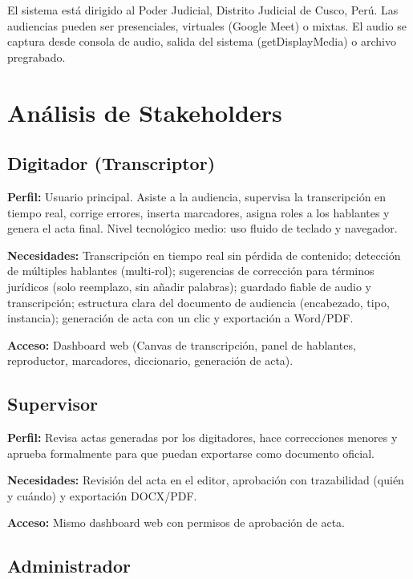 \documentclass[12pt,a4paper]{report}
\begin{document}
El sistema está dirigido al Poder Judicial, Distrito Judicial de Cusco, Perú. Las audiencias pueden ser presenciales, virtuales (Google Meet) o mixtas. El audio se captura desde consola de audio, salida del sistema (getDisplayMedia) o archivo pregrabado.

\section{Análisis de Stakeholders}

\subsection{Digitador (Transcriptor)}

\textbf{Perfil:} Usuario principal. Asiste a la audiencia, supervisa la transcripción en tiempo real, corrige errores, inserta marcadores, asigna roles a los hablantes y genera el acta final. Nivel tecnológico medio: uso fluido de teclado y navegador.

\textbf{Necesidades:} Transcripción en tiempo real sin pérdida de contenido; detección de múltiples hablantes (multi-rol); sugerencias de corrección para términos jurídicos (solo reemplazo, sin añadir palabras); guardado fiable de audio y transcripción; estructura clara del documento de audiencia (encabezado, tipo, instancia); generación de acta con un clic y exportación a Word/PDF.

\textbf{Acceso:} Dashboard web (Canvas de transcripción, panel de hablantes, reproductor, marcadores, diccionario, generación de acta).

\subsection{Supervisor}

\textbf{Perfil:} Revisa actas generadas por los digitadores, hace correcciones menores y aprueba formalmente para que puedan exportarse como documento oficial.

\textbf{Necesidades:} Revisión del acta en el editor, aprobación con trazabilidad (quién y cuándo) y exportación DOCX/PDF.

\textbf{Acceso:} Mismo dashboard web con permisos de aprobación de acta.

\subsection{Administrador}
\end{document}
